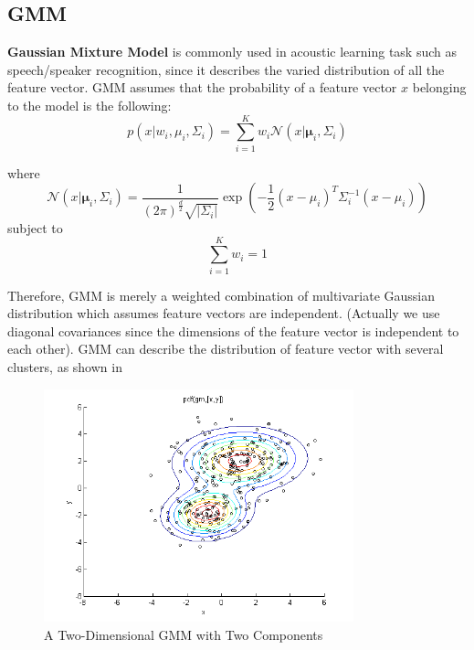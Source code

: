 

\subsection{GMM}
\textbf{Gaussian Mixture Model} is commonly used in acoustic learning task such as speech/speaker recognition,
since it describes the varied distribution of all the feature vector.\cite{GMM}
GMM assumes that the probability of a feature vector $x$ belonging to the model is the following:
\begin{equation}
p(x | w_i, \mu_i, \Sigma_i) = \sum_{i=1}^{K}{w_i \mathcal{N}(x | \mathbf{\mu}_i, \Sigma_i)}
\label{eqn:gmm}
\end{equation}

where
\[\mathcal{N}(x | \mathbf{\mu}_i, \Sigma_i) = \dfrac{1}{(2\pi)^{\frac{d}{2}}\sqrt{|\Sigma_i|}}
\exp \left({-\dfrac{1}{2}(x-\mu_i)^T\Sigma_i^{-1}(x-\mu_i)}\right)\]
subject to
\[\sum_{i=1}^{K} w_i = 1\]

  Therefore, GMM is merely a weighted combination of multivariate Gaussian distribution which
  assumes feature vectors are independent.
  (Actually we use diagonal covariances since the dimensions of the feature vector is independent to each other).
  GMM can describe the distribution of feature vector with several clusters, as shown in 
\begin{figure}[H]
  \centering
  \includegraphics[width=0.8\textwidth]{img/gmm.png}
  \caption{A Two-Dimensional GMM with Two Components\label{fig:gmm-fig}}
\end{figure}

